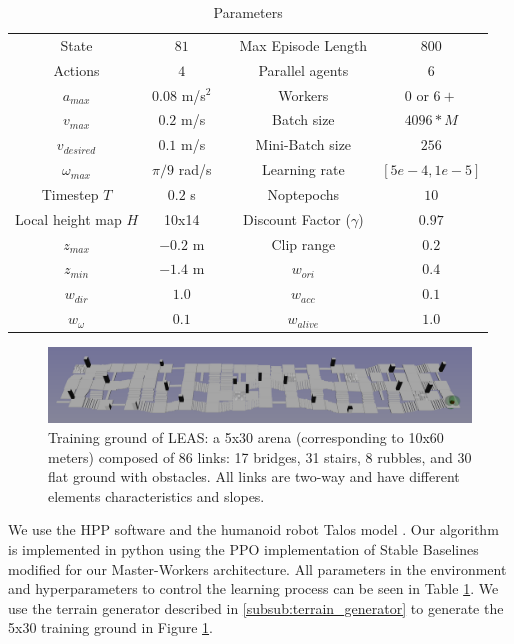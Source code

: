 \begin{table}[ht]
\begin{center}
\caption{Parameters}
\begin{tabular}{|c|c| c |c|c|}
 State & $81$ && Max Episode Length & $800$\\
 Actions & $4$ && Parallel agents & $6$\\
 $a_{max}$ & $0.08$ m/s$^2$ && Workers & $0$ \: or \: $6+$ \\
 $v_{max}$ & $0.2$ m/s && Batch size & $4096*M$\\
 $v_{desired}$ & $0.1$ m/s && Mini-Batch size & $256$\\
 $\omega_{max}$ & $\pi/9$ rad/s && Learning rate & $[5e-4,1e-5]$\\
 Timestep $T$ & $0.2$ s && Noptepochs & $10$\\
 Local height map $H$ & 10x14 && Discount Factor ($\gamma$) & $0.97$\\
 $z_{max}$ & $-0.2$ m  && Clip range & $0.2$\\
 $z_{min}$ & $-1.4$ m &&
 $w_{ori}$ & $0.4$ \\
 $w_{dir}$ & $1.0$  &&
 $w_{acc}$ & $0.1$ \\
 $w_{\omega}$ & $0.1$  &&
 $w_{alive}$ & $1.0$
\end{tabular}
\label{tab:param}
\end{center}
\end{table}

\begin{figure}
    \centering
    \includegraphics[width=\textwidth]{Figures/Chapter_LEAS/arena_5x30.png}
    \caption{Training ground of LEAS: a 5x30 arena (corresponding to 10x60 meters) composed of 86 links: 17 bridges, 31 stairs, 8 rubbles, and 30 flat ground with obstacles. All links are two-way and have different elements characteristics and slopes.}
    \label{fig:arena_5x30}
\end{figure}

We use the HPP software \cite{HPP} and the humanoid robot Talos model \cite{talos_robot}. Our algorithm is implemented in python using the PPO implementation of Stable Baselines \cite{stable-baselines} modified for our Master-Workers architecture.
All parameters in the environment and hyperparameters to control the learning process can be seen in Table \ref{tab:param}. We use the terrain generator described in \ref{subsub:terrain_generator} to generate the 5x30 training ground in Figure \ref{fig:arena_5x30}.

